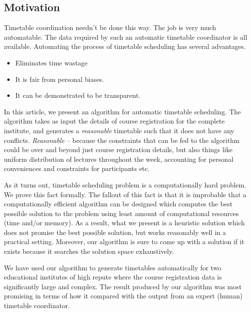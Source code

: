 \documentclass[11pt,a4paper]{article}
\begin{document}
\subsection{Motivation}
Timetable coordination needn’t be done this way. The job is very much automatable. The data required by such an automatic timetable coordinator is all available. Automating the process of timetable scheduling has several advantages.
\begin{itemize}
\item Eliminates time wastage
\item It is fair from personal biases.
\item It can be demonstrated to be transparent.

\end{itemize}
 
In this article, we present an algorithm for automatic timetable scheduling. The algorithm takes as input the details of course registration for the complete institute, and generates a \emph{reasonable} timetable such that it does not have any conflicts. \emph{Reasonable} -- because the constraints that can be fed to the algorithm could be over and beyond just course registration details, but also things like uniform distribution of lectures throughout the week, accounting for personal conveniences and constraints for participants etc. 

As it turns out, timetable scheduling problem is a computationally hard problem. We prove this fact formally. The fallout of this fact is that it is improbable that a computationally efficient algorithm can be designed which computes the best possible solution to the problem using least amount of computational resources (time and/or memory). As a result, what we present is a heuristic solution which does not promise the best possible solution, but works reasonably well in a practical setting. Moreover, our algorithm is sure to come up with a solution if it exists because it searches the solution space exhaustively.

We have used our algorithm to generate timetables automatically for two educational institutes of high repute where the course registration data is significantly large and complex. The result produced by our algorithm was most promising in terms of how it compared with the output from an expert (human) timetable coordinator. 
\end{document}
